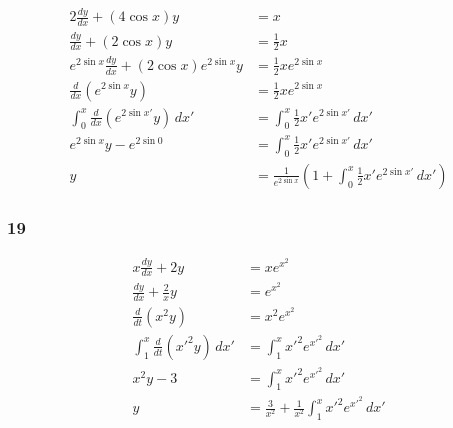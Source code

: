 \documentclass{article}
\begin{document}
\begin{align*}
  2 \frac{dy}{dx} + (4 \cos x) y                         & = x                                                                                     \\
  \frac{dy}{dx} + (2 \cos x) y                           & = \frac{1}{2} x                                                                         \\
  e^{2 \sin x} \frac{dy}{dx} + (2 \cos x) e^{2 \sin x} y & = \frac{1}{2} x e^{2 \sin x}                                                            \\
  \frac{d}{dx} (e^{2 \sin x} y)                          & = \frac{1}{2} x e^{2 \sin x}                                                            \\
  \int_0^x \frac{d}{dx} (e^{2 \sin x'} y) \,dx'          & = \int_0^x \frac{1}{2} x' e^{2 \sin x'} \,dx'                                           \\
  e^{2 \sin x} y - e^{2 \sin 0}                          & = \int_0^x \frac{1}{2} x' e^{2 \sin x'} \,dx'                                           \\
  y                                                      & = \frac{1}{e^{2 \sin x}} \left( 1 + \int_0^x \frac{1}{2} x' e^{2 \sin x'} \,dx' \right)
\end{align*}

\subsubsection{19}

\begin{align*}
  x \frac{dy}{dx} + 2y                 & = xe^{x^2}                                                   \\
  \frac{dy}{dx} + \frac{2}{x} y        & = e^{x^2}                                                    \\
  \frac{d}{dt} (x^2 y)                 & = x^2 e^{x^2}                                                \\
  \int_1^x \frac{d}{dt} (x'^2 y) \,dx' & = \int_1^x x'^2 e^{x'^2} \,dx'                               \\
  x^2 y - 3                            & = \int_1^x x'^2 e^{x'^2} \,dx'                               \\
  y                                    & = \frac{3}{x^2} + \frac{1}{x^2} \int_1^x x'^2 e^{x'^2} \,dx'
\end{align*}
\end{document}
